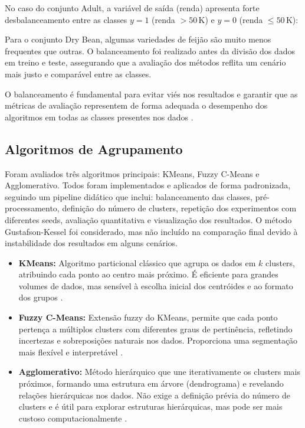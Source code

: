 No caso do conjunto Adult, a variável de saída (renda) apresenta forte desbalanceamento entre as classes $y = 1$ (renda $>\!50\,\mathrm{K}$) e $y = 0$ (renda $\leq\!50\,\mathrm{K}$):

Para o conjunto Dry Bean, algumas variedades de feijão são muito menos frequentes que outras. O balanceamento foi realizado antes da divisão dos dados em treino e teste, assegurando que a avaliação dos métodos reflita um cenário mais justo e comparável entre as classes.

O balanceamento é fundamental para evitar viés nos resultados e garantir que as métricas de avaliação representem de forma adequada o desempenho dos algoritmos em todas as classes presentes nos dados \cite{chawla2002smote, he2009learning}.

\subsection{Algoritmos de Agrupamento}

Foram avaliados três algoritmos principais: KMeans, Fuzzy C-Means e Agglomerativo. Todos foram implementados e aplicados de forma padronizada, seguindo um pipeline didático que inclui: balanceamento das classes, pré-processamento, definição do número de clusters, repetição dos experimentos com diferentes seeds, avaliação quantitativa e visualização dos resultados. O método Gustafson-Kessel foi considerado, mas não incluído na comparação final devido à instabilidade dos resultados em alguns cenários.

\begin{itemize}
    \item \textbf{KMeans:} Algoritmo particional clássico que agrupa os dados em $k$ clusters, atribuindo cada ponto ao centro mais próximo. É eficiente para grandes volumes de dados, mas sensível à escolha inicial dos centróides e ao formato dos grupos \cite{lloyd1982least}.
    \item \textbf{Fuzzy C-Means:} Extensão fuzzy do KMeans, permite que cada ponto pertença a múltiplos clusters com diferentes graus de pertinência, refletindo incertezas e sobreposições naturais nos dados. Proporciona uma segmentação mais flexível e interpretável \cite{bezdek1981pattern}.
    \item \textbf{Agglomerativo:} Método hierárquico que une iterativamente os clusters mais próximos, formando uma estrutura em árvore (dendrograma) e revelando relações hierárquicas nos dados. Não exige a definição prévia do número de clusters e é útil para explorar estruturas hierárquicas, mas pode ser mais custoso computacionalmente \cite{mullner2011modern}.
\end{itemize}

